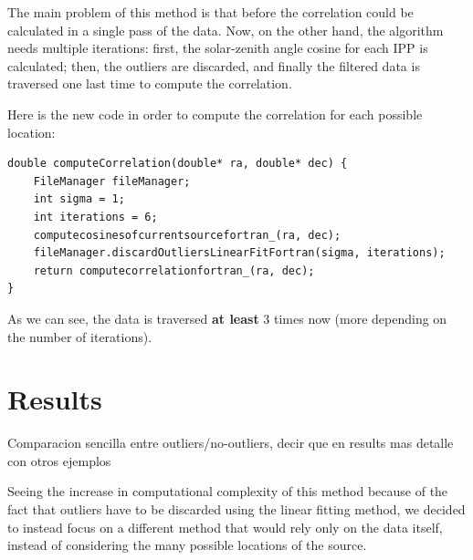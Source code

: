 The main problem of this method is that before the correlation could be calculated in a single pass of the data. Now, on the other hand, the algorithm needs multiple iterations: first, the solar-zenith angle cosine for each IPP is calculated; then, the outliers are discarded, and finally the filtered data is traversed one last time to compute the correlation.

Here is the new code in order to compute the correlation for each possible location:

\begin{minipage}{\linewidth}
\begin{lstlisting}[style=myCStyle, caption=Discarding outliers and computing the correlation]
double computeCorrelation(double* ra, double* dec) {
	FileManager fileManager;
	int sigma = 1;
	int iterations = 6;
	computecosinesofcurrentsourcefortran_(ra, dec);
	fileManager.discardOutliersLinearFitFortran(sigma, iterations);
	return computecorrelationfortran_(ra, dec);
}\end{lstlisting}
\end{minipage}

As we can see, the data is traversed \textbf{at least} 3 times now (more depending on the number of iterations).

\section{Results}

Comparacion sencilla entre outliers/no-outliers, decir que en results mas detalle con otros ejemplos

Seeing the increase in computational complexity of this method because of the fact that outliers have to be discarded using the linear fitting method, we decided to instead focus on a different method that would rely only on the data itself, instead of considering the many possible locations of the source.
